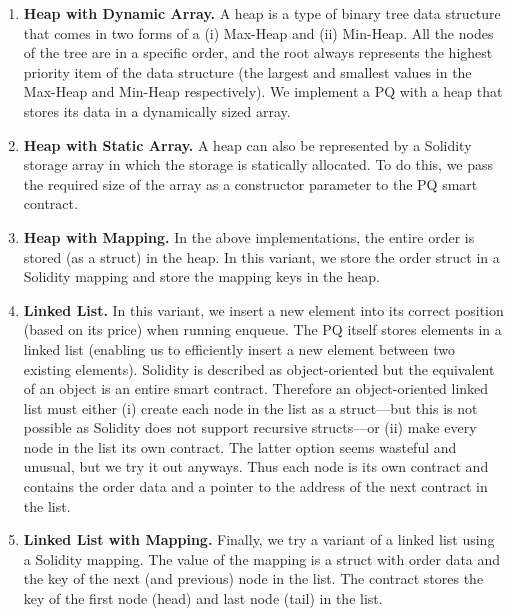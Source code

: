 \begin{enumerate}

\item \textbf{Heap with Dynamic Array.} A heap is a type of binary tree data structure that comes in two forms of a (i) Max-Heap and (ii) Min-Heap. All the nodes of the tree are in a specific order, and the root always represents the highest priority item of the data structure (the largest and smallest values in the Max-Heap and Min-Heap respectively). We implement a PQ with a heap that stores its data in a dynamically sized array. 

\item \textbf{Heap with Static Array.} A heap can also be represented by a Solidity storage array in which the storage is statically allocated. To do this, we pass the required size of the array as a constructor parameter to the PQ smart contract. 

\item \textbf{Heap with Mapping.} In the above implementations, the entire order is stored (as a struct) in the heap. In this variant, we store the order struct in a Solidity mapping and store the mapping keys in the heap.  

\item \textbf{Linked List.} In this variant, we insert a new element into its correct position (based on its price) when running enqueue. The PQ itself stores elements in a linked list (enabling us to efficiently insert a new element between two existing elements). Solidity is described as object-oriented but the equivalent of an object is an entire smart contract. Therefore an object-oriented linked list must either (i) create each node in the list as a struct---but this is not possible as Solidity does not support recursive structs---or (ii) make every node in the list its own contract. The latter option seems wasteful and unusual, but we try it out anyways. Thus each node is its own contract and contains the order data and a pointer to the address of the next contract in the list.

\item \textbf{Linked List with Mapping.} Finally, we try a variant of a linked list using a Solidity mapping. The value of the mapping is a struct with order data and the key of the next (and previous) node in the list. The contract stores the key of the first node (head) and last node (tail) in the list. 

\end{enumerate}

